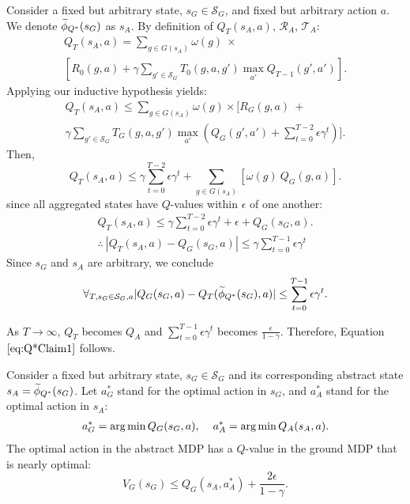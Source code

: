 Consider a fixed but arbitrary state, $s_G \in \mathcal{S}_G$, and fixed but arbitrary action $a$.
We denote $\widetilde \phi_{Q^*}(s_G)$ as $s_A$. 
By definition of $Q_{T}(s_A, a)$, $\mathcal{R}_A$, $\mathcal{T}_A$:
\begin{multline*}
Q_T(s_A, a) = \sum_{g \in G(s_A)}\omega(g)\ \times \\ 
 \left[ R_0(g,a) + \gamma \sum_{g' \in \mathcal{S}_G} T_0(g,a,g') \max_{a'} Q_{T-1}(g', a')      \right].
\end{multline*}
Applying our inductive hypothesis yields:
\begin{multline*}
Q_T(s_A, a) \leq \sum_{g \in G(s_A)}\omega(g) \times \biggl[ R_G(g,a)\ + \\ \gamma \sum_{g' \in \mathcal{S}_G} T_G(g,a,g') \max_{a'}(Q_G(g', a') + \sum_{t=0}^{T-2} \epsilon \gamma^t) \biggr].
\end{multline*}
Then,
\begin{equation*}
Q_T(s_A, a) \leq \gamma\sum_{t=0}^{T-2} \epsilon \gamma^t + \sum_{g \in G(s_A)}\left[ \omega(g)\ Q_G(g,a)\right].
\end{equation*}
since all aggregated states have $Q$-values within $\epsilon$ of one another:
\begin{align*}
Q_T(s_A, a) \leq \gamma\sum_{t=0}^{T-2} \epsilon \gamma^t + \epsilon + Q_G(s_G, a). \\
\therefore\ \left| Q_{T}(s_A, a) - Q_G(s_G,a) \right| \leq \gamma\sum_{t=0}^{T-1}\epsilon \gamma^t
\end{align*}
Since $s_G$ and $s_A$ are arbitrary, we conclude
\begin{equation}
\forall_{T, s_G \in \mathcal{S}_G, a} |Q_G(s_G, a) - Q_T(\widetilde \phi_{Q^*}(s_G), a)| \leq \sum_{t=0}^{T-1} \epsilon \gamma^t.
\end{equation}

As $T \rightarrow \infty$, $Q_T$ becomes $Q_A$ and $\sum_{t=0}^{T-1} \epsilon \gamma^t$ becomes $\frac{\epsilon}{1-\gamma}$. Therefore, Equation $\ref{eq:Q*Claim1}$ follows. \\

\begin{clm}
\label{clm:optAbsActionNearOptGround}

Consider a fixed but arbitrary state, $s_G \in \mathcal{S}_G$ and its corresponding abstract state $s_A=\widetilde \phi_{Q^*}(s_G)$.
Let $a^*_G$ stand for the optimal action in $s_G$, and $a^*_A$ stand for the optimal action in $s_A$:
\begin{align*}
a^*_G = \operatorname*{arg\,min} Q_G(s_G, a), \hspace{4mm}
a^*_A = \operatorname*{arg\,min} Q_A(s_A, a).
\end{align*}
The optimal action in the abstract MDP has a $Q$-value in the ground MDP that is nearly optimal:
\begin{equation}
\label{eq:Q*Claim2}
V_G(s_G) \leq Q_G(s_A, a^*_A) + \frac{2\epsilon}{1-\gamma}.
\end{equation}
\end{clm}

